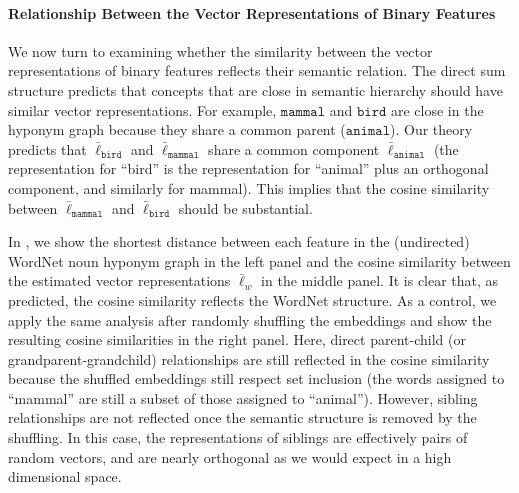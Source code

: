 \documentclass{article}
\newcommand{\ConceptName}[1]{$\mathtt{#1}$}
\newcommand{\ConceptValue}[1]{\texttt{#1}}
\begin{document}
\paragraph{Relationship Between the Vector Representations of Binary Features}
We now turn to examining whether the similarity between the vector representations of binary features reflects their semantic relation.
The direct sum structure predicts that concepts that are close in semantic hierarchy should have similar vector representations.
For example, \ConceptName{mammal} and \ConceptName{bird} are close in the hyponym graph because they share a common parent (\ConceptName{animal}). Our theory predicts that $\bar\ell_{\ConceptValue{bird}}$ and $\bar\ell_{\ConceptValue{mammal}}$ share a common component $\bar\ell_{\ConceptValue{animal}}$ (the representation for ``bird'' is the representation for ``animal'' plus an orthogonal component, and similarly for mammal).
This implies that the cosine similarity between $\bar\ell_{\ConceptValue{mammal}}$ and $\bar\ell_{\ConceptValue{bird}}$ should be substantial. 

In , we show the shortest distance between each feature in the (undirected) WordNet noun hyponym graph in the left panel and the cosine similarity between the estimated vector representations $\bar\ell_w$ in the middle panel. It is clear that, as predicted, the cosine similarity reflects the WordNet structure. 
As a control, we apply the same analysis after randomly shuffling the embeddings and show the resulting cosine similarities in the right panel.
Here, direct parent-child (or grandparent-grandchild) relationships are still reflected in the cosine similarity because the shuffled embeddings still respect set inclusion (the words assigned to ``mammal'' are still a subset of those assigned to ``animal''). However, sibling relationships are not reflected once the semantic structure is removed by the shuffling. In this case, the representations of siblings are effectively pairs of random vectors, and are nearly orthogonal as we would expect in a high dimensional space.
\end{document}
